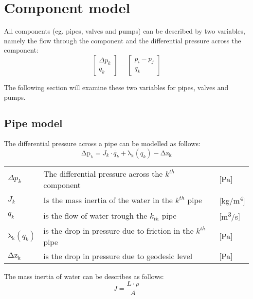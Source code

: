 \section{Component model}
All components (eg. pipes, valves and pumps) can be described by two variables, namely the flow through the component and the differential pressure across the component:
\begin{equation}
\begin{bmatrix} \Delta{p_{k}} \\ q_{k} \end{bmatrix} = 
\begin{bmatrix} p_{i} - p_{j} \\ q_{k} \end{bmatrix}    
\end{equation}

The following section will examine these two variables for pipes, valves and pumps.

\subsection{Pipe model}
The differential pressure across a pipe can be modelled as follows:
\begin{equation}
    \mathrm{\Delta{p_{k}}} = J_{k}\cdot\dot{q_{k}}+\mathrm{\lambda_{k}}(q_{k})-\mathrm{\Delta{z_{k}}}
\end{equation}


	\begin{center}
		\begin{tabular}{l p{8cm} l}
			
			$\Delta{p_{k}}$ & The differential pressure across the $k^{th}$ component & [\si{Pa}]\\ 
		  	${J_{k}}$ & Is the mass inertia of the water in the $k^{th}$ pipe & [\si{kg}/\si{m^{4}}] \\
		  	$q_{k}$ & is the flow of water trough the $k_{th}$ pipe & [{\si{\meter\cubed}/\si{s}}] \\
		  	$\mathrm{\lambda_{k}}(q_{k})$ & is the drop in pressure due to friction in the $k^{th}$ pipe & [\si{Pa}] \\
		  	$\mathrm{\Delta{z_{k}}}$ & is the drop in pressure due to geodesic level & [\si{Pa}]\\
			\end{tabular}
	\end{center}

The mass inertia of water can be describes as follows:
\begin{equation}
	J= \frac{L\cdot \rho}{A}
\end{equation}


